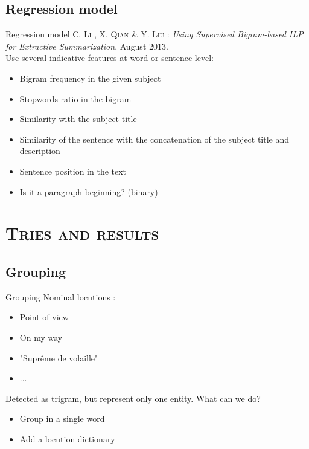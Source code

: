 \documentclass[xcolor=x11names,compress]{beamer}
\renewcommand{\(}{\begin{columns}}
\renewcommand{\)}{\end{columns}}
\newcommand{\<}[1]{\begin{column}{#1}}
\renewcommand{\>}{\end{column}}
\begin{document}
\subsection{Regression model}
\begin{frame}{Regression model}
\textsc{C. Li , X. Qian} \& \textsc{Y. Liu} : \textit{Using Supervised Bigram-based ILP for Extractive Summarization}, August 2013.\\
\vspace{1cm}
Use several indicative features at word or sentence level:
\begin{itemize}
\item Bigram frequency in the given subject
\item Stopwords ratio in the bigram
\item Similarity with the subject title
\item Similarity of the sentence with the concatenation of the subject title and description
\item Sentence position in the text
\item Is it a paragraph beginning? (binary)\\
\end{itemize}
\end{frame}

\section{\scshape Tries and results}
\subsection{Grouping}
\begin{frame}{Grouping}
Nominal locutions :
\begin{itemize}
\item Point of view
\item On my way
\item "Suprême de volaille"
\item ...
\end{itemize}
Detected as trigram, but represent only one entity. What can we do?
\begin{itemize}
\item Group in a single word
\item Add a locution dictionary
\end{itemize}
\end{frame}
\end{document}
